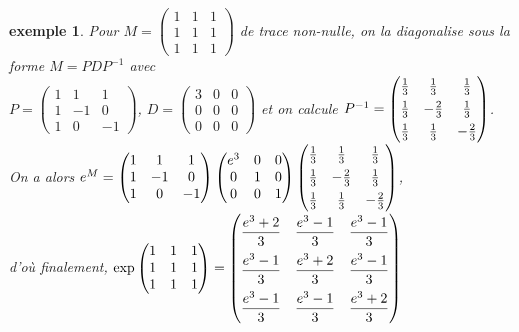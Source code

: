 \documentclass[a4paper]{article}
\newtheorem*{example}{exemple}
\begin{document}
\begin{example}
    Pour $M = \begin{pmatrix} 1 & 1 & 1 \\ 1 & 1 & 1 \\ 1 & 1 & 1 \end{pmatrix}$ de trace non-nulle, on la diagonalise sous la forme $M = PDP^{-1}$ avec \\$P = \begin{pmatrix} 1 & 1 & 1 \\ 1 & -1 & 0 \\ 1 & 0 & -1 \end{pmatrix}$, $D = \begin{pmatrix} 3 & 0 & 0 \\ 0 & 0 & 0 \\ 0 & 0 & 0 \end{pmatrix}$ et on calcule $\setlength{\delimitershortfall}{0pt} P^{-1} =  \begin{pmatrix} \frac{1}{3} & \frac{1}{3} & \frac{1}{3} \\[1ex] \frac{1}{3} & -\frac{2}{3} & \frac{1}{3} \\[1ex] \frac{1}{3} & \frac{1}{3} & -\frac{2}{3} \end{pmatrix}$.\\On a alors $e^M = \begin{pmatrix} 1 & 1 & 1 \\ 1 & -1 & 0 \\ 1 & 0 & -1 \end{pmatrix} \begin{pmatrix} e^3 & 0 & 0 \\ 0 & 1 & 0 \\ 0 & 0 & 1 \end{pmatrix}\setlength{\delimitershortfall}{0pt} \begin{pmatrix} \frac{1}{3} & \frac{1}{3} & \frac{1}{3} \\[1ex] \frac{1}{3} & -\frac{2}{3} & \frac{1}{3} \\[1ex] \frac{1}{3} & \frac{1}{3} & -\frac{2}{3} \end{pmatrix}$, \\d'où finalement, $\exp\begin{pmatrix} 1 & 1 & 1 \\ 1 & 1 & 1 \\ 1 & 1 & 1 \end{pmatrix} = \setlength{\delimitershortfall}{0pt} \begin{pmatrix} \dfrac{e^3 + 2}{3} & \dfrac{e^3-1}{3} & \dfrac{e^3-1}{3} \\[2ex] \dfrac{e^3-1}{3} & \dfrac{e^3 + 2}{3} & \dfrac{e^3-1}{3} \\[2ex] \dfrac{e^3-1}{3} & \dfrac{e^3-1}{3} & \dfrac{e^3 + 2}{3} \end{pmatrix}$
    
\end{example}
\end{document}
